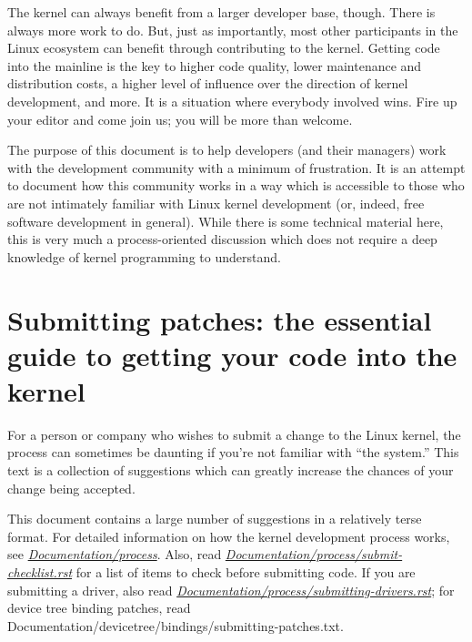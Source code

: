 \documentclass[a4paper,8pt,english]{sphinxmanual}
\begin{document}
The kernel can always benefit from a larger developer base, though.  There
is always more work to do.  But, just as importantly, most other
participants in the Linux ecosystem can benefit through contributing to the
kernel.  Getting code into the mainline is the key to higher code quality,
lower maintenance and distribution costs, a higher level of influence over
the direction of kernel development, and more.  It is a situation where
everybody involved wins.  Fire up your editor and come join us; you will be
more than welcome.

The purpose of this document is to help developers (and their managers)
work with the development community with a minimum of frustration.  It is
an attempt to document how this community works in a way which is
accessible to those who are not intimately familiar with Linux kernel
development (or, indeed, free software development in general).  While
there is some technical material here, this is very much a process-oriented
discussion which does not require a deep knowledge of kernel programming to
understand.


\chapter{Submitting patches: the essential guide to getting your code into the kernel}
\label{process/submitting-patches:submitting-patches-the-essential-guide-to-getting-your-code-into-the-kernel}\label{process/submitting-patches::doc}\label{process/submitting-patches:submittingpatches}
For a person or company who wishes to submit a change to the Linux
kernel, the process can sometimes be daunting if you're not familiar
with ``the system.''  This text is a collection of suggestions which
can greatly increase the chances of your change being accepted.

This document contains a large number of suggestions in a relatively terse
format.  For detailed information on how the kernel development process
works, see {\hyperref[process/development\string-process:development\string-process\string-main]{\emph{Documentation/process}}}.
Also, read {\hyperref[process/submit\string-checklist:submitchecklist]{\emph{Documentation/process/submit-checklist.rst}}}
for a list of items to check before
submitting code.  If you are submitting a driver, also read
{\hyperref[process/submitting\string-drivers:submittingdrivers]{\emph{Documentation/process/submitting-drivers.rst}}};
for device tree binding patches, read
Documentation/devicetree/bindings/submitting-patches.txt.
\end{document}
